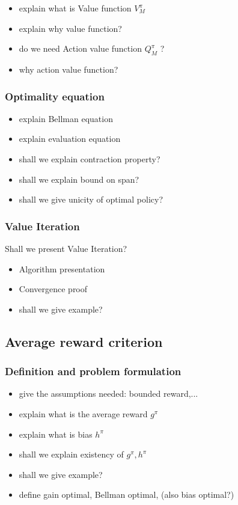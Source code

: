 \begin{itemize}
    \item explain what is Value function $V^\pi_M$
    \item explain why value function?
    \item do we need Action value function $Q^\pi_M$ ?
    \item why action value function?
\end{itemize}

\subsubsection{Optimality equation}

\begin{itemize}
    \item explain Bellman equation
    \item explain evaluation equation 
    \item shall we explain contraction property?
    \item shall we explain bound on span?
    \item shall we give unicity of optimal policy?
\end{itemize}

\subsubsection{Value Iteration}

Shall we present Value Iteration?

\begin{itemize}
    \item Algorithm presentation
    \item Convergence proof
    \item shall we give example?
\end{itemize}

\subsection{Average reward criterion}

\subsubsection{Definition and problem formulation}

\begin{itemize}
    \item give the assumptions needed: bounded reward,...
    \item explain what is the average reward $g^\pi$
    \item explain what is bias $h^\pi$
    \item shall we explain existency of $g^\pi, h^\pi$
    \item shall we give example?
    \item define gain optimal, Bellman optimal, (also bias optimal?)
\end{itemize}

